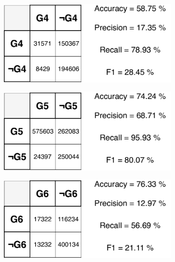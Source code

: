 \begin{figure}[H]
\vspace{3mm}
\begin{subfigure}{.33\textwidth}
  \centering
  \includegraphics[width=\textwidth]{tex/images/results/rese_g4_512}  
\end{subfigure}%
\begin{subfigure}{.33\textwidth}
  \centering
  \includegraphics[width=\textwidth]{tex/images/results/rese_g5_512}
\end{subfigure}
\begin{subfigure}{.33\textwidth}
  \centering
  \includegraphics[width=\textwidth]{tex/images/results/rese_g6_512}
\end{subfigure}


\end{figure}
